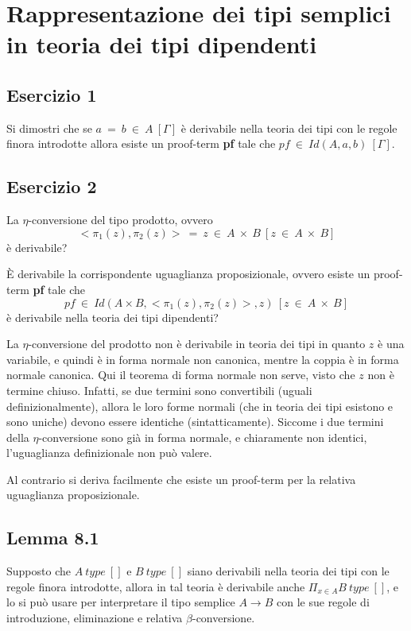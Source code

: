 \newpage
\section{Rappresentazione dei tipi semplici in teoria dei tipi dipendenti}
\subsection{Esercizio 1}
\begin{thm}
	Si dimostri che se $a~=~b~\in~A~[\Gamma]$ è derivabile nella teoria dei tipi con le regole finora introdotte allora esiste un proof-term \textbf{pf} tale che $pf~\in~Id(A,a,b)~[\Gamma]$.
\end{thm}


\subsection{Esercizio 2}
\begin{thm}
	La $\eta$-conversione del tipo prodotto, ovvero
	\[<\pi_1(z),\pi_2(z)>~=~z~\in~A~\times~B~[z~\in~A~\times~B]\]
	è derivabile?
	
	È derivabile la corrispondente uguaglianza proposizionale, ovvero esiste un proof-term \textbf{pf} tale che
	\[pf~\in~Id(A\times B,<\pi_1(z),\pi_2(z)>,z)~[z~\in~A~\times~B]\]
	è derivabile nella teoria dei tipi dipendenti?
\end{thm}
La $\eta$-conversione del prodotto non è derivabile in teoria dei tipi in quanto $z$ è una variabile, e quindi è in forma normale non canonica, mentre la coppia è in forma normale canonica. Qui il teorema di forma normale non serve, visto che $z$ non è termine chiuso. Infatti, se due termini sono convertibili (uguali definizionalmente), allora le loro forme normali (che in teoria dei tipi esistono e sono uniche) devono essere identiche (sintatticamente). Siccome i due termini della $\eta$-conversione sono già in forma normale, e chiaramente non identici, l’uguaglianza definizionale non può valere.

Al contrario si deriva facilmente che esiste un proof-term per la relativa uguaglianza proposizionale.


\subsection{Lemma 8.1}
\begin{lem}
	Supposto che $A~type~[]$ e $B~type~[]$ siano derivabili nella teoria dei tipi con le regole finora introdotte, allora in tal teoria è derivabile anche $\Pi_{x\in A}B~type~[]$, e lo si può usare per interpretare il tipo semplice $A\to B$ con le sue regole di introduzione, eliminazione e relativa $\beta$-conversione.
\end{lem}

